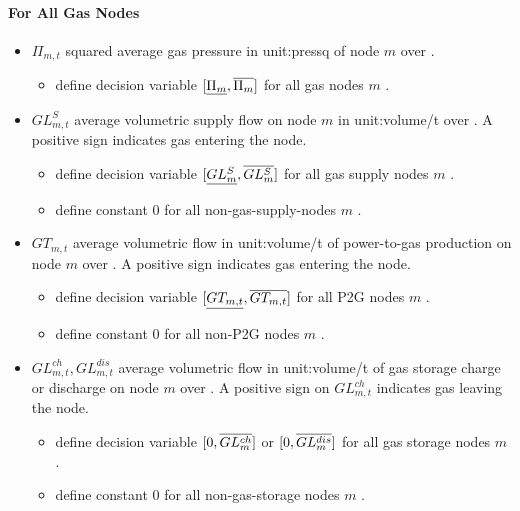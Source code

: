 \paragraph{For All Gas Nodes}
\begin{itemize}

\item $\Pi_{m,t}$ squared average gas pressure in \gls{unit:pressq} of node $m$
  over \intervaloft{}.  \begin{itemize} \item \gls{define} decision variable
    $[\underline{\Pi_m}, \overline{\Pi_m}]$ for all gas nodes $m$ \atallt{}.  \end{itemize}

\item $GL^S_{m,t}$ average volumetric supply flow on node $m$ in
  \gls{unit:volume/t} over \intervaloft{}. A positive sign indicates gas
  entering the node.  \begin{itemize} \item \gls{define} decision variable
  $[\underline{GL^S_m}, \overline{GL^S_m}]$ for all gas supply nodes
  $m$ \atallt{}.  \item \gls{define} constant $0$ for all non-gas-supply-nodes
  $m$ \atallt{}.  \end{itemize}

\item $GT_{m,t}$ average volumetric flow in \gls{unit:volume/t}
of power-to-gas production on node $m$ over \intervaloft{}. A positive sign
  indicates gas entering the node.  \begin{itemize} \item \gls{define} decision
  variable $[\underline{GT_{m,t}}, \overline{GT_{m,t}}]$ for all P2G nodes
  $m$ \atallt{}. \item \gls{define} constant $0$ for all non-P2G nodes
  $m$ \atallt{}.  \end{itemize}


\item $GL^{ch}_{m,t}, GL^{dis}_{m,t}$ average volumetric flow in \gls{unit:volume/t}
of gas storage charge or discharge on node $m$ over \intervaloft{}. A positive
  sign on $GL^{ch}_{m,t}$ indicates gas leaving the
  node.  \begin{itemize} \item \gls{define} decision variable
  $[0, \overline{GL^{ch}_m}]$ or $[0, \overline{GL^{dis}_m}]$ for all gas storage nodes
  $m$ \atallt{}.  \item \gls{define} constant $0$ for all non-gas-storage nodes
  $m$ \atallt{}. \end{itemize}


\end{itemize}
